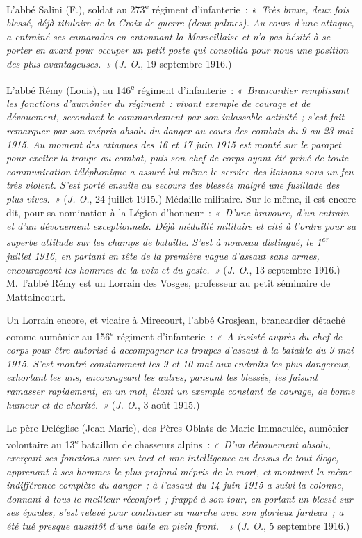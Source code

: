 \documentclass[french,twoside]{book} %
\begin{document}
L’abbé Salini (F.), soldat au 273\textsuperscript{e} régiment d’infanterie : \emph{« Très brave, deux fois blessé, déjà titulaire de la Croix de guerre (deux palmes). Au cours d’une attaque, a entraîné ses camarades en entonnant la Marseillaise et n’a pas hésité à se porter en avant pour occuper un petit poste qui consolida pour nous une position des plus avantageuses. »} ({\itshape J. O.}, 19 septembre 1916.)‌\par
L’abbé Rémy (Louis), au 146\textsuperscript{e} régiment d’infanterie : \emph{« Brancardier remplissant les fonctions d’aumônier du régiment : vivant exemple de courage et de dévouement, secondant le commandement par son inlassable activité ; s’est fait remarquer par son mépris absolu du danger au cours des combats du 9 au 23 mai 1915. Au moment des attaques des 16 et 17 juin 1915 est monté sur le parapet pour exciter la troupe au combat, puis son chef de corps ayant été privé de toute communication téléphonique a assuré lui-même le service des liaisons sous un feu très violent. S’est porté ensuite au secours des blessés malgré une fusillade des plus vives. »} ({\itshape J. O.}, 24 juillet 1915.) Médaille militaire. Sur le même, il est encore dit, pour sa nomination à la Légion d’honneur : \emph{« D’une bravoure, d’un entrain et d’un dévouement exceptionnels. Déjà médaillé militaire et cité à l’ordre pour sa superbe attitude sur les champs de bataille. S’est à nouveau distingué, le 1\textsuperscript{er} juillet 1916, en partant en tête de la première vague d’assaut sans armes, encourageant les hommes de la voix et du geste. »} ({\itshape J. O.}, 13 septembre 1916.) M. l’abbé Rémy est un Lorrain des Vosges, professeur au petit séminaire de Mattaincourt.‌\par
Un Lorrain encore, et vicaire à Mirecourt, l’abbé Grosjean, brancardier détaché comme aumônier au 156\textsuperscript{e} régiment d’infanterie : \emph{« A insisté auprès du chef de corps pour être autorisé à accompagner les troupes d’assaut à la bataille du 9 mai 1915. S’est montré constamment les 9 et 10 mai aux endroits les plus dangereux, exhortant les uns, encourageant les autres, pansant les blessés, les faisant ramasser rapidement, en un mot, étant un exemple constant de courage, de bonne humeur et de charité. »} ({\itshape J. O.}, 3 août 1915.)‌\par
Le père Deléglise (Jean-Marie), des Pères Oblats de Marie Immaculée, aumônier volontaire au 13\textsuperscript{e} bataillon de chasseurs alpins : \emph{« D’un dévouement absolu, exerçant ses fonctions avec un tact et une intelligence au-dessus de tout éloge, apprenant à ses hommes le plus profond mépris de la mort, et montrant la même indifférence complète du danger ; à l’assaut du 14 juin 1915 a suivi la colonne, donnant à tous le meilleur réconfort ; frappé à son tour, en portant un blessé sur ses épaules, s’est relevé pour continuer sa marche avec son glorieux fardeau ; a été tué presque aussitôt d’une balle en plein front.  »} ({\itshape J. O.}, 5 septembre 1916.)‌\par
\end{document}
